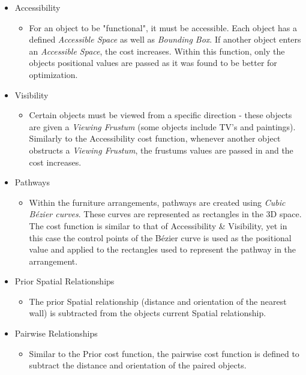 \begin{itemize}
    \item Accessibility
        \begin{itemize}
            \item For an object to be "functional", it must be accessible. Each object has a defined \textit{Accessible Space} as well as \textit{Bounding Box}. If another object enters an \textit{Accessible Space}, the cost increases. Within this function, only the objects positional values are passed as it was found to be better for optimization.
        \end{itemize}
    \item Visibility
        \begin{itemize}
            \item Certain objects must be viewed from a specific direction - these objects are given a \textit{Viewing Frustum} (some objects include TV's and paintings). Similarly to the Accessibility cost function, whenever another object obstructs a \textit{Viewing Frustum}, the frustums values are passed in and the cost increases.
        \end{itemize}
    \item Pathways
        \begin{itemize}
            \item Within the furniture arrangements, pathways are created using \textit{Cubic Bézier curves}. These curves are represented as rectangles in the 3D space. The cost function is similar to that of Accessibility \& Visibility, yet in this case the control points of the Bézier curve is used as the positional value and applied to the rectangles used to represent the pathway in the arrangement.
        \end{itemize}
    \item Prior Spatial Relationships
        \begin{itemize}
            \item The prior Spatial relationship (distance and orientation of the nearest wall) is subtracted from the objects current Spatial relationship.
        \end{itemize}
    \item Pairwise Relationships
        \begin{itemize}
            \item Similar to the Prior cost function, the pairwise cost function is defined to subtract the distance and orientation of the paired objects.
        \end{itemize}
\end{itemize}
